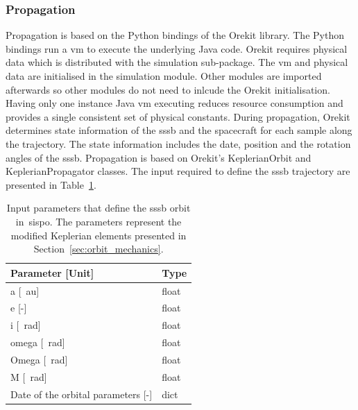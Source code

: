 
\subsubsection{Propagation}
Propagation is based on the Python bindings of the Orekit library. The Python bindings run a \gls{vm} to execute the underlying Java code. Orekit requires physical data which is distributed with the simulation sub-package. The \gls{vm} and physical data are initialised in the simulation module. Other modules are imported afterwards so other modules do not need to inlcude the Orekit initialisation. Having only one instance Java \gls{vm} executing reduces resource consumption and provides a single consistent set of physical constants. During propagation, Orekit determines state information of the \gls{sssb} and the spacecraft for each sample along the trajectory. The state information includes the date, position and the rotation angles of the \gls{sssb}. Propagation is based on Orekit's KeplerianOrbit and KeplerianPropagator classes. The input required to define the \gls{sssb} trajectory are presented in Table~\ref{tab:keplerorbit_params}.

\begin{table}[htb]
    \centering
    \caption{Input parameters that define the \gls{sssb} orbit in~\gls{sispo}. The parameters represent the modified Keplerian elements presented in Section~\ref{sec:orbit_mechanics}.}
    \label{tab:keplerorbit_params}
    \begin{tabular}{p{}|p{}}
        \textbf{Parameter [Unit]} & \textbf{Type} \\ \hline
        a [\SI{}{\astronomicalunit}] & float\\
        e [-] & float\\
        i [\SI{}{\radian}] & float \\
        omega [\SI{}{\radian}] & float \\
        Omega [\SI{}{\radian}] & float \\
        M [\SI{}{\radian}] & float \\
        Date of the orbital parameters [-] & dict\footnotemark
    \end{tabular}
\end{table}

